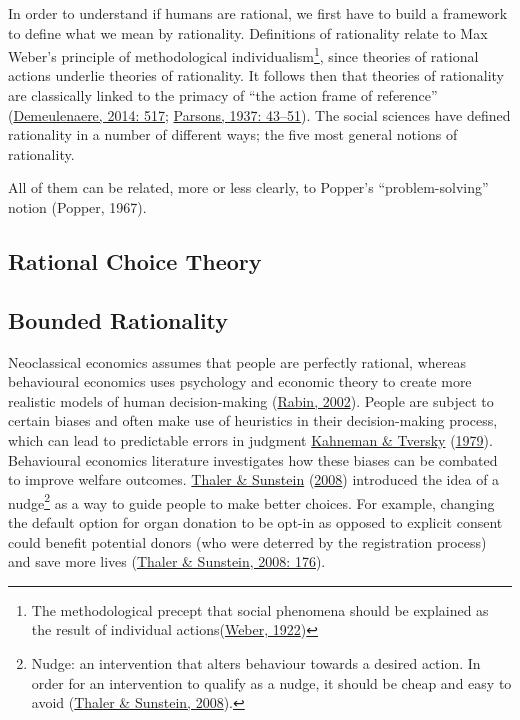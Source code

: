 \documentclass[11pt,preprint, authoryear]{elsarticle}
\numberwithin{equation}{section}
\numberwithin{figure}{section}
\numberwithin{table}{section}
\let\rmarkdownfootnote\footnote%
\def\footnote{\protect\rmarkdownfootnote}
\begin{document}
In order to understand if humans are rational, we first have to build a
framework to define what we mean by rationality. Definitions of
rationality relate to Max Weber's principle of methodological
individualism\footnote{The methodological precept that social phenomena
  should be explained as the result of individual
  actions(\protect\hyperlink{ref-weber}{Weber, 1922})}, since theories
of rational actions underlie theories of rationality. It follows then
that theories of rationality are classically linked to the primacy of
``the action frame of reference''
(\protect\hyperlink{ref-types}{Demeulenaere, 2014: 517};
\protect\hyperlink{ref-parsons}{Parsons, 1937: 43--51}). The social
sciences have defined rationality in a number of different ways; the
five most general notions of rationality.

All of them can be related, more or less clearly, to Popper's
``problem-solving'' notion (Popper, 1967).

\hypertarget{rational-choice-theory}{%
\subsection{Rational Choice Theory}\label{rational-choice-theory}}

\hypertarget{bounded-rationality}{%
\subsection{Bounded Rationality}\label{bounded-rationality}}

Neoclassical economics assumes that people are perfectly rational,
whereas behavioural economics uses psychology and economic theory to
create more realistic models of human decision-making
(\protect\hyperlink{ref-rabin}{Rabin, 2002}). People are subject to
certain biases and often make use of heuristics in their decision-making
process, which can lead to predictable errors in judgment
\protect\hyperlink{ref-prospect}{Kahneman \& Tversky}
(\protect\hyperlink{ref-prospect}{1979}). Behavioural economics
literature investigates how these biases can be combated to improve
welfare outcomes. \protect\hyperlink{ref-nudge}{Thaler \& Sunstein}
(\protect\hyperlink{ref-nudge}{2008}) introduced the idea of a
nudge\footnote{Nudge: an intervention that alters behaviour towards a
  desired action. In order for an intervention to qualify as a nudge, it
  should be cheap and easy to avoid
  (\protect\hyperlink{ref-nudge}{Thaler \& Sunstein, 2008}).} as a way
to guide people to make better choices. For example, changing the
default option for organ donation to be opt-in as opposed to explicit
consent could benefit potential donors (who were deterred by the
registration process) and save more lives
(\protect\hyperlink{ref-nudge}{Thaler \& Sunstein, 2008: 176}).
\end{document}
